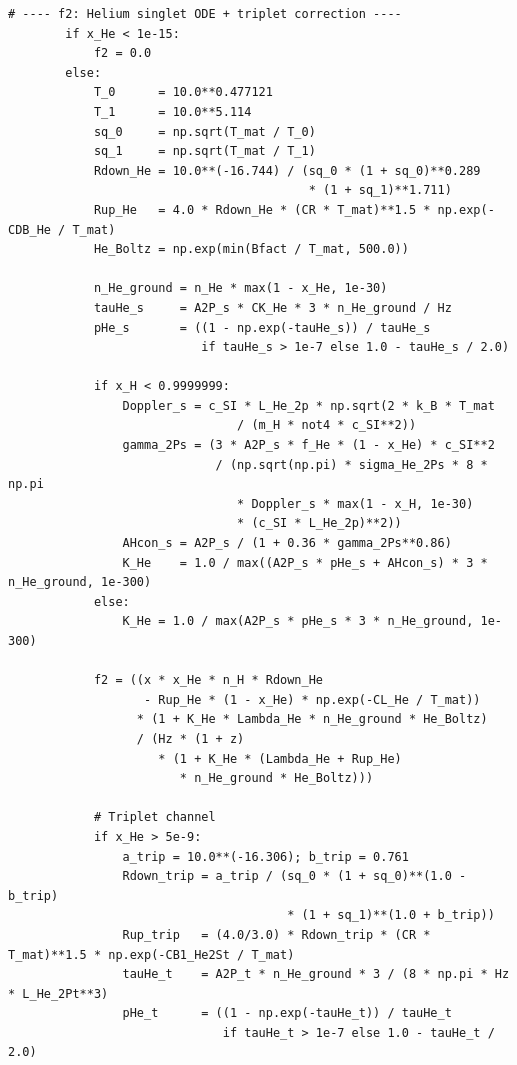 \begin{codebox}
\begin{lstlisting}[style=python]
        # ---- f2: Helium singlet ODE + triplet correction ----
        if x_He < 1e-15:
            f2 = 0.0
        else:
            T_0      = 10.0**0.477121
            T_1      = 10.0**5.114
            sq_0     = np.sqrt(T_mat / T_0)
            sq_1     = np.sqrt(T_mat / T_1)
            Rdown_He = 10.0**(-16.744) / (sq_0 * (1 + sq_0)**0.289
                                          * (1 + sq_1)**1.711)
            Rup_He   = 4.0 * Rdown_He * (CR * T_mat)**1.5 * np.exp(-CDB_He / T_mat)
            He_Boltz = np.exp(min(Bfact / T_mat, 500.0))

            n_He_ground = n_He * max(1 - x_He, 1e-30)
            tauHe_s     = A2P_s * CK_He * 3 * n_He_ground / Hz
            pHe_s       = ((1 - np.exp(-tauHe_s)) / tauHe_s
                           if tauHe_s > 1e-7 else 1.0 - tauHe_s / 2.0)

            if x_H < 0.9999999:
                Doppler_s = c_SI * L_He_2p * np.sqrt(2 * k_B * T_mat
                                / (m_H * not4 * c_SI**2))
                gamma_2Ps = (3 * A2P_s * f_He * (1 - x_He) * c_SI**2
                             / (np.sqrt(np.pi) * sigma_He_2Ps * 8 * np.pi
                                * Doppler_s * max(1 - x_H, 1e-30)
                                * (c_SI * L_He_2p)**2))
                AHcon_s = A2P_s / (1 + 0.36 * gamma_2Ps**0.86)
                K_He    = 1.0 / max((A2P_s * pHe_s + AHcon_s) * 3 * n_He_ground, 1e-300)
            else:
                K_He = 1.0 / max(A2P_s * pHe_s * 3 * n_He_ground, 1e-300)

            f2 = ((x * x_He * n_H * Rdown_He
                   - Rup_He * (1 - x_He) * np.exp(-CL_He / T_mat))
                  * (1 + K_He * Lambda_He * n_He_ground * He_Boltz)
                  / (Hz * (1 + z)
                     * (1 + K_He * (Lambda_He + Rup_He)
                        * n_He_ground * He_Boltz)))

            # Triplet channel
            if x_He > 5e-9:
                a_trip = 10.0**(-16.306); b_trip = 0.761
                Rdown_trip = a_trip / (sq_0 * (1 + sq_0)**(1.0 - b_trip)
                                       * (1 + sq_1)**(1.0 + b_trip))
                Rup_trip   = (4.0/3.0) * Rdown_trip * (CR * T_mat)**1.5 * np.exp(-CB1_He2St / T_mat)
                tauHe_t    = A2P_t * n_He_ground * 3 / (8 * np.pi * Hz * L_He_2Pt**3)
                pHe_t      = ((1 - np.exp(-tauHe_t)) / tauHe_t
                              if tauHe_t > 1e-7 else 1.0 - tauHe_t / 2.0)


\end{lstlisting}
\end{codebox}
